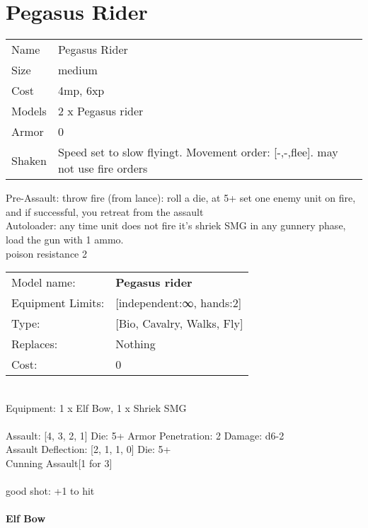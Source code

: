 \pagebreak\pagebreak

\section{ Pegasus Rider }

\begin{tabular}{ll}
  Name & Pegasus Rider \\
  Size & medium\\
  Cost & 4mp, 6xp\\
  Models & 2 x Pegasus rider\\
  Armor & 0\\
  Shaken & Speed set to slow flyingt. Movement order: [-,-,flee]. may not use fire orders\\
\end{tabular}

\noindent Pre-Assault: throw fire (from lance): roll a die, at 5+ set one enemy unit on fire, and if successful, you retreat from the assault\\ 
Autoloader: any time unit does not fire it's shriek SMG in any gunnery phase, load the gun with 1 ammo.\\ 
poison resistance 2\\ 


\noindent
\begin{tabular}{ll}
Model name: &{\bf Pegasus rider } \\
Equipment Limits: &[independent:∞, hands:2] \\
Type: &[Bio, Cavalry, Walks, Fly] \\
Replaces: &Nothing \\
Cost: & 0\\
\end{tabular}
\ \\
Equipment: 1 x Elf Bow, 1 x Shriek SMG \\
\ \\
Assault: [4, 3, 2, 1] Die: 5+ Armor Penetration: 2 Damage: d6-2 \\
Assault Deflection: [2, 1, 1, 0] Die: 5+\\
\indent Cunning Assault[1 for 3]\\ 
 
\ \\
good shot: +1 to hit\\ 

\ \\
{\bf Elf Bow } \\



